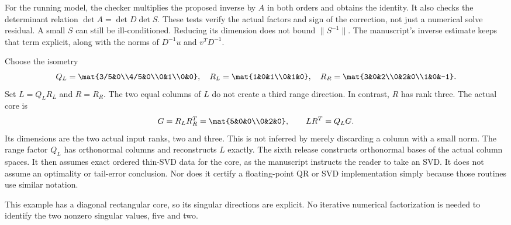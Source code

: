 For the running model, the checker multiplies the proposed inverse by $A$ in both orders and obtains the identity. It also checks the determinant relation $\det A=\det D\det S$. These tests verify the actual factors and sign of the correction, not just a numerical solve residual.
A small $S$ can still be ill-conditioned. Reducing its dimension does not bound $\|S^{-1}\|$. The manuscript's inverse estimate keeps that term explicit, along with the norms of $D^{-1}u$ and $v^TD^{-1}$.

Choose the isometry
\[
Q_L=\mat{3/5&0\\4/5&0\\0&1\\0&0},\quad
R_L=\mat{1&0&1\\0&1&0},\quad
R_R=\mat{3&0&2\\0&2&0\\1&0&-1}.
\]
Set $L=Q_LR_L$ and $R=R_R$. The two equal columns of $L$ do not create a third range direction. In contrast, $R$ has rank three.
The actual core is
\[
G=R_LR_R^T=\mat{5&0&0\\0&2&0},\qquad LR^T=Q_LG.
\]
Its dimensions are the two actual input ranks, two and three. This is not inferred by merely discarding a column with a small norm. The range factor $Q_L$ has orthonormal columns and reconstructs $L$ exactly.
The sixth release constructs orthonormal bases of the actual column spaces. It then assumes exact ordered thin-SVD data for the core, as the manuscript instructs the reader to take an SVD. It does not assume an optimality or tail-error conclusion. Nor does it certify a floating-point QR or SVD implementation simply because those routines use similar notation.

This example has a diagonal rectangular core, so its singular directions are explicit. No iterative numerical factorization is needed to identify the two nonzero singular values, five and two.

